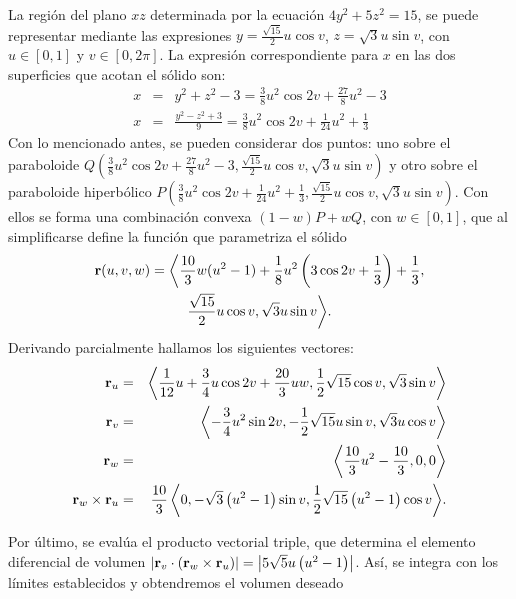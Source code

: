 \begin{parrafonumerado}
La región del plano $xz$ determinada por la ecuación $4y^{2}+5z^{2}=15$, se puede representar mediante las expresiones $y=\frac{\sqrt{15}}{2}u\cos v$, $z=\sqrt{3}u\sin v$, con $u \in [0,1]$ y $v \in [0,2\pi]$. La expresión correspondiente para $x$ en las dos superficies que acotan el sólido son:
%
\begin{eqnarray*}
  x &=&y^{2}+z^{2}-3= \frac{3}{8}u^{2}\cos 2v+\frac{27}{8}u^{2}-3\\
  x&=&\frac{y^{2}-z^{2}+3}{9}= \frac{3}{8}u^{2}\cos 2v+\frac{1}{24}u^{2}+\frac{1}{3}
\end{eqnarray*}
%
Con lo mencionado antes,
se pueden considerar dos puntos: uno sobre el paraboloide {\small $Q\left( \frac{3}{8}u^{2}\cos 2v+\frac{27}{8}u^{2}-3,\frac{\sqrt{15}}{2}u\cos v,\sqrt{3}u\sin v\right)$} y otro sobre el paraboloide hiperbólico
{\small $P\left(\frac{3}{8}u^{2}\cos2v+\frac{1}{24}u^{2}+\frac{1}{3},\frac{\sqrt{15}}{2}u\cos v,\sqrt{3}u\sin v\right)\!.$}
Con ellos se forma una combinación convexa {\small $(1-w) P +wQ$, con $w \in [0,1]$,} que al simplificarse define la función que parametriza el sólido
%
{\small
  \begin{multline*}
    {\bf r}(u,v,w)= \bigg\langle \frac{10}{3}w(u^{2}-1)+\frac{1}{8}u^{2}\left(3\cos 2v+\frac{1}{3}\right)+\frac{1}{3}, \\
    \frac{\sqrt{15}}{2}u\cos v,\sqrt{3}u\sin v \bigg \rangle.
  \end{multline*}
}
%
Derivando parcialmente hallamos los siguientes vectores:
%
{\small
  \begin{eqnarray*}
    {\bf r}_{u} &=&\left\langle \frac{1}{12}u+\frac{3}{4}u\cos 2v+\frac{20}{3}uw,\frac{1}{2}\sqrt{15}\cos v,\sqrt{3}\sin v\right\rangle\\
    {\bf r}_{v}&=&\left\langle -\frac{3}{4}u^{2}\sin 2v,-\frac{1}{2}\sqrt{15}u\sin v,\sqrt{3}u\cos v\right\rangle  \\
    {\bf r}_{w}&=&\left\langle \frac{10}{3}u^{2}-\frac{10}{3},0,0\right\rangle  \\
    {\bf r}_{w}\times {\bf r}_{u}&=& \frac{10}{3} \left\langle 0,-\sqrt{3}\left( u^{2}-1\right) \sin v,\frac{1}{2}\sqrt{15}\left( u^{2}-1\right) \cos v \right\rangle\!.
  \end{eqnarray*}
}

Por último, se evalúa el producto vectorial triple, que determina el ele\-mento diferencial de volumen
$\left\vert {\bf r}_{v}\cdot \left({\bf r}_{w}\times {\bf r}_{u}\right) \right\vert= \left\vert 5\sqrt{5}u\left( u^{2}-1\right) \right\vert$. Así, se integra con los límites establecidos y obtendremos el volumen deseado


\end{parrafonumerado}
